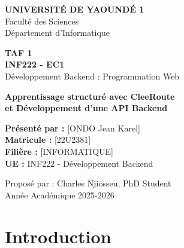 \documentclass[12pt,a4paper]{article}
\begin{document}
\begin{titlepage}
    \centering
    \vspace{2cm}

    {\LARGE \textbf{UNIVERSITÉ DE YAOUNDÉ 1}} \\
    \vspace{0.5cm}
    {\Large Faculté des Sciences} \\
    \vspace{0.3cm}
    {\large Département d'Informatique} \\

    \vspace{3cm}

    {\Huge \textbf{TAF 1}} \\
    \vspace{0.5cm}
    {\LARGE \textbf{INF222 - EC1}} \\
    \vspace{0.3cm}
    {\Large Développement Backend : Programmation Web} \\

    \vspace{2cm}

    {\Large \textbf{Apprentissage structuré avec CleeRoute}} \\
    {\Large \textbf{et Développement d'une API Backend}} \\

    \vspace{3cm}

    \begin{flushleft}
    \large
    \textbf{Présenté par :} [ONDO Jean Karel] \\
    \textbf{Matricule :} [22U2381] \\
    \textbf{Filière :} [INFORMATIQUE] \\
    \textbf{UE :} INF222 - Développement Backend \\
    \end{flushleft}

    \vfill

    {\large Proposé par : Charles Njiosseu, PhD Student} \\
    \vspace{0.5cm}
    {\large Année Académique 2025-2026}

\end{titlepage}

\newpage
\tableofcontents
\newpage

\section{Introduction}
\end{document}
